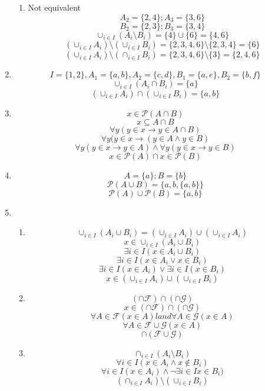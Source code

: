 \begin{enumerate}
\begin{enumerate}
        \item Not equivalent 
        \[A_2 = \{2,4\}; A_3 = \{3,6\}\]
        \[B_2 = \{2,3\}; B_3 = \{3,4\}\]
        \[\cup_{i \in I} (A_i \setminus B_i) = \{4\} \cup \{6\} = \{4,6\}\]
        \[(\cup_{i \in I} A_i) \setminus (\cup_{i \in I} B_i) = \{2,3,4,6\} \setminus \{2,3,4\} = \{6\}\]
        \[(\cup_{i \in I} A_i) \setminus (\cap_{i \in I} B_i) = \{2,3,4,6\} \setminus \{3\} = \{2,4,6\}\]
    \end{enumerate}
    \item
    \[I = \{1,2\}, A_1=\{a, b\}, A_2 =\{c,d\},B_1=\{a,e\},B_2=\{b,f\}\]
    \[\cup_{i \in I}(A_i \cap B_i) = \{a\}\]
    \[(\cup_{i \in I} A_i) \cap (\cup_{i \in I}B_i) = \{a,b\}\]
    \item
    \[x \in \mathscr{P}(A \cap B)\]
    \[x \subseteq A \cap B\]
    \[\forall y (y \in x \rightarrow y \in A \cap B)\]
    \[\forall y (y \in x \rightarrow (y \in A \land y \in B)\]
    \[\forall y (y \in x \rightarrow y \in A) \land \forall y (y \in x \rightarrow y \in B)\]
    \[x \in \mathscr{P}(A) \cap x \in \mathscr{P}(B)\]
    \item
    \[A = \{a\}; B=\{b\}\]
    \[\mathscr{P}(A \cup B) = \{a,b,\{a,b\}\}\]
    \[\mathscr{P}(A) \cup \mathscr{P}(B) = \{a,b\}\]
    \item
    \begin{enumerate}
        \item 
        \[\cup_{i \in I} (A_i \cup B_i) = (\cup_{i \in I} A_i) \cup (\cup_{i \in I} A_i)\]
        \[x \in \cup_{i \in I} (A_i \cup B_i)\]
        \[\exists i \in I (x \in A_i \cup B_i)\]
        \[\exists i \in I (x \in A_i \lor x \in B_i)\]
        \[\exists i \in I (x \in A_i) \lor \exists i \in I (x \in B_i)\]
        \[x \in (\cup_{i \in I} A_i) \cup (\cup_{i \in I} B_i)\]
        \item 
        \[(\cap \mathscr{F}) \cap (\cap \mathscr{G})\]
        \[x \in (\cap \mathscr{F}) \cap (\cap \mathscr{G})\]
        \[\forall A \in \mathscr{F}(x \in A) land \forall A \in \mathscr{G}(x \in A)\]
        \[\forall A \in \mathscr{F} \cup \mathscr{G} (x \in A)\]
        \[\cap (\mathscr{F} \cup \mathscr{G})\]
        \item 
        \[\cap_{i \in I} (A_i \setminus B_i)\]
        \[\forall i \in I (x \in A_i \land x \notin B_i)\]
        \[\forall i \in I (x \in A_i) \land \lnot \exists i \in I x \in B_i)\]
        \[(\cap_{i \in I} A_i) \setminus (\cup_{i \in I} B_i)\]
    \end{enumerate}

\end{enumerate}
